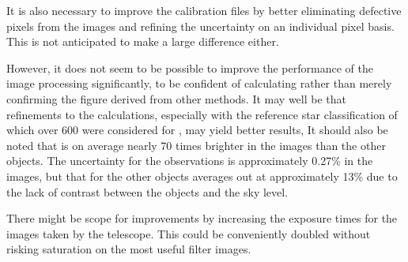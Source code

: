 It is also necessary to improve the calibration files by better eliminating
defective pixels from the images and refining the uncertainty on an individual
pixel basis. This is not anticipated to make a large difference either.

However, it does not seem to be possible to improve the performance of the
{\rem} image processing significantly, to be confident of calculating rather
than merely confirming the figure derived from other methods.
It may well be that refinements to the calculations, especially with the
reference star classification of which over 600 were considered for \ross, may
yield better results, It should also be noted that {\ross} is on average nearly
70 times brighter in the images than the other objects. The uncertainty for the
{\ross} observations is approximately 0.27\% in the images, but that for the
other objects averages out at approximately 13\% due to the lack of contrast
between the objects and the sky level.

There might be scope for improvements by increasing the exposure times for the
images taken by the {\rem} telescope. This could be conveniently doubled without
risking saturation on the most useful filter images.
